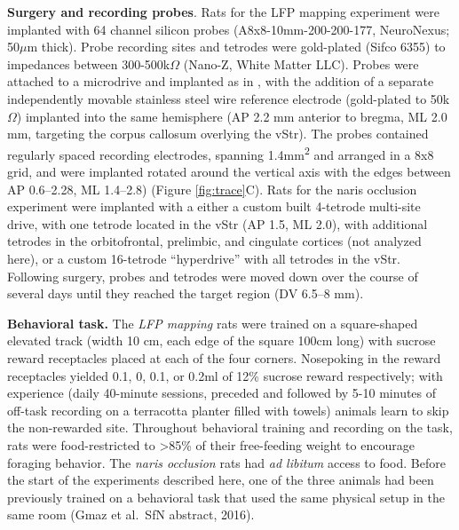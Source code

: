 \documentclass[11pt]{article}
\let\citeN=\citet
\begin{document}
{\bf Surgery and recording probes}. Rats for the LFP mapping
experiment were implanted with 64 channel silicon probes
(A8x8-10mm-200-200-177, NeuroNexus; 50$\mu$m thick). Probe recording
sites and tetrodes were gold-plated (Sifco 6355) to impedances between
300-500k$\Omega$ (Nano-Z, White Matter LLC). Probes were attached to a
microdrive and implanted as in \citeN{Vandecasteele2012}, with the
addition of a separate independently movable stainless steel wire
reference electrode (gold-plated to 50k$\Omega$) implanted into the
same hemisphere (AP 2.2 mm anterior to bregma, ML 2.0 mm, targeting
the corpus callosum overlying the vStr).  The probes contained
regularly spaced recording electrodes, spanning
1.4mm\textsuperscript{2} and arranged in a 8x8 grid, and were
implanted rotated around the vertical axis with the edges between AP
0.6--2.28, ML 1.4--2.8) (Figure \ref{fig:trace}C).  Rats for the naris
occlusion experiment were implanted with a either a custom built
4-tetrode multi-site drive, with one tetrode located in the vStr (AP
1.5, ML 2.0), with additional tetrodes in the orbitofrontal,
prelimbic, and cingulate cortices (not analyzed here), or a custom
16-tetrode ``hyperdrive'' with all tetrodes in the vStr.  Following
surgery, probes and tetrodes were moved down over the course of
several days until they reached the target region (DV 6.5--8 mm).

{\bf Behavioral task.} The {\it LFP mapping} rats were trained on a
square-shaped elevated track (width 10 cm, each edge of the square
100cm long) with sucrose reward receptacles placed at each of the four
corners. Nosepoking in the reward receptacles yielded 0.1, 0, 0.1, or
0.2ml of 12\% sucrose reward respectively; with experience (daily
40-minute sessions, preceded and followed by 5-10 minutes of off-task
recording on a terracotta planter filled with towels) animals learn to
skip the non-rewarded site. Throughout behavioral training and
recording on the task, rats were food-restricted to \textgreater85\%
of their free-feeding weight to encourage foraging behavior. The {\it
  naris occlusion} rats had {\it ad libitum} access to food. Before
the start of the experiments described here, one of the three animals
had been previously trained on a behavioral task that used the same
physical setup in the same room (Gmaz et al.\ SfN abstract, 2016).
\end{document}
